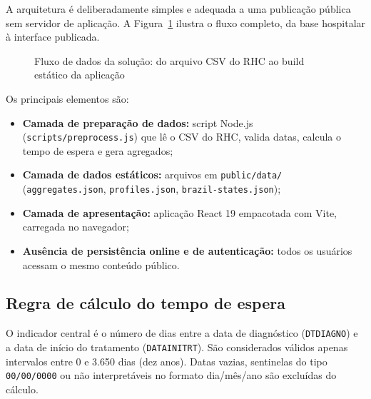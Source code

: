 A arquitetura é deliberadamente simples e adequada a uma publicação pública sem servidor de aplicação. A Figura~\ref{fig:arquitetura} ilustra o fluxo completo, da base hospitalar à interface publicada.

\begin{figure}[H]
\centering
\caption{Fluxo de dados da solução: do arquivo CSV do RHC ao build estático da aplicação}
\label{fig:arquitetura}
\end{figure}

Os principais elementos são:

\begin{itemize}
	\item \textbf{Camada de preparação de dados:} script Node.js (\texttt{scripts/preprocess.js}) que lê o \acs{CSV} do \acs{RHC}, valida datas, calcula o tempo de espera e gera agregados;
	\item \textbf{Camada de dados estáticos:} arquivos em \texttt{public/data/} (\texttt{aggregates.json}, \texttt{profiles.json}, \texttt{brazil-states.json});
	\item \textbf{Camada de apresentação:} aplicação React 19 empacotada com Vite, carregada no navegador;
	\item \textbf{Ausência de persistência online e de autenticação:} todos os usuários acessam o mesmo conteúdo público.
\end{itemize}

\subsection{Regra de cálculo do tempo de espera}

O indicador central é o número de dias entre a data de diagnóstico (\texttt{DTDIAGNO}) e a data de início do tratamento (\texttt{DATAINITRT}). São considerados válidos apenas intervalos entre 0 e 3.650 dias (dez anos). Datas vazias, sentinelas do tipo \texttt{00/00/0000} ou não interpretáveis no formato dia/mês/ano são excluídas do cálculo.


